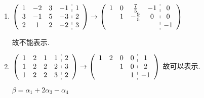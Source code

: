 	 \paragraph{} %
		 \begin{enumerate}
			 \item %
			       \( \left(\begin{array}{cccc:c}
				       1 & -2 & 3 & -1 & 1 \\
				       3 & -1 & 5 & -3 & 2 \\
				       2 & 1  & 2 & -2 & 3
			       \end{array}\right)
			       \to
			       \left(\begin{array}{cccc:c}
				       1 & 0 & \frac{7}{5}  & -1 & 0  \\
				         & 1 & -\frac{9}{5} & 0  & 0  \\
				         &   &              &    & -1
			       \end{array}\right) \)

			       故不能表示.
			 \item %
			       \( \left(\begin{array}{cccc:c}
					       1 & 2 & 1 & 1 & 2 \\
					       1 & 2 & 2 & 2 & 3 \\
					       1 & 2 & 2 & 3 & 2
				       \end{array}\right)
			       \to
			       \left(\begin{array}{cccc:c}
					       1 & 2 & 0 & 0 & 1  \\
					         &   & 1 & 0 & 2  \\
					         &   &   & 1 & -1
				       \end{array}\right)
			       \)
			       故可以表示.

			       \( \beta = \alpha_{1} + 2\alpha_{3} - \alpha_{4} \)
		 \end{enumerate}


